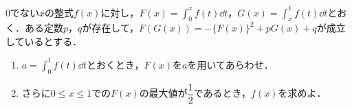 \documentclass[../../main.tex]{subfiles}
\begin{document}
$0$でない$x$の整式$f(x)$に対し，${\displaystyle F(x)=\int_0^x f(t)\dd t }$，${\displaystyle G(x)=\int_x^1 f(t)\dd t }$とおく．ある定数$p$，$q$が存在して，$F(G(x))=-\{F(x)\}^2+pG(x)+q$が成立しているとする．
\begin{enumerate}
  \item ${\displaystyle a=\int_0^1 f(t)\dd t }$とおくとき，$F(x)$を$a$を用いてあらわせ．
  \item さらに$0\le x\le 1$での$F(x)$の最大値が$\dfrac{1}{2}$であるとき，$f(x)$を求めよ．
\end{enumerate}
\end{document}
